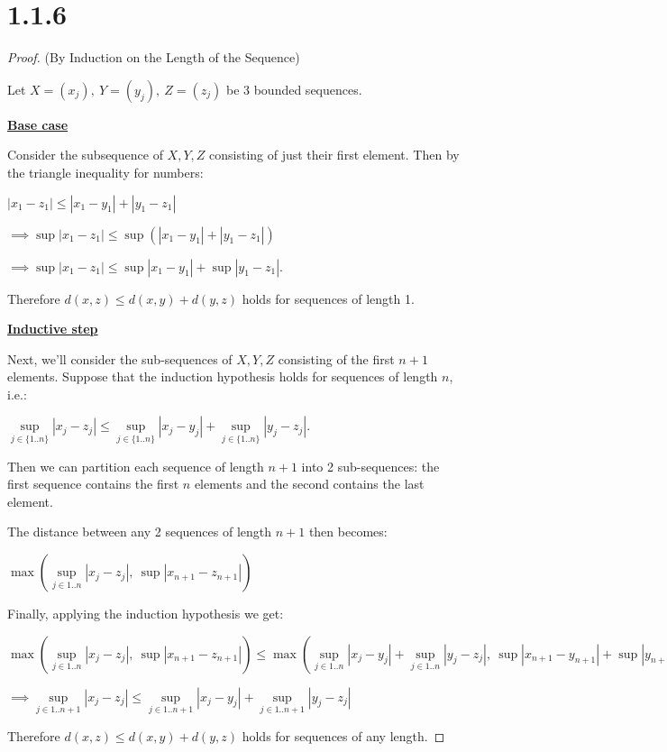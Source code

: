 \documentclass{article}
\begin{document}
\section*{1.1.6}

\begin{proof}{(By Induction on the Length of the Sequence)}
  $ $

  Let $X=(x_j), \ Y=(y_j), \ Z=(z_j)$ be 3 bounded sequences.
  \newline

  \textbf{\underline{Base case}}

  Consider the subsequence of $X,Y,Z$ consisting of just their first element. Then by the triangle inequality for numbers:

  \qquad $|x_1 - z_1| \leq |x_1 - y_1| + |y_1 - z_1|$

  $\implies \sup |x_1 - z_1| \leq \sup (|x_1 - y_1| + |y_1 - z_1|)$

  $\implies \sup |x_1 - z_1| \leq \sup |x_1 - y_1| + \sup |y_1 - z_1|$.
\newline

  Therefore $d(x,z) \leq d(x,y) + d(y,z)$ holds for sequences of length 1.
  \newline

\textbf{\underline{Inductive step}}

Next, we'll consider the sub-sequences of $X,Y,Z$ consisting of the first $n+1$ elements. Suppose that the induction hypothesis holds for sequences of length $n$, i.e.:

\qquad $\sup\limits_{j \in \{1..n\}} |x_j - z_j| \leq \sup\limits_{j \in \{1..n\}} |x_j - y_j| + \sup\limits_{j \in \{1..n\}} |y_j - z_j|$.
\newline

Then we can partition each sequence of length $n+1$ into 2 sub-sequences: the first sequence contains the first $n$ elements and the second contains the last element.
\newline

The distance between any 2 sequences of length $n+1$ then becomes:

\qquad$\max(\sup \limits_{j \in 1..n} |x_j - z_j|, \ \sup |x_{n+1} - z_{n+1}|)$
\newline

Finally, applying the induction hypothesis we get:

\qquad$\max(\sup \limits_{j \in 1..n} |x_j - z_j|, \ \sup |x_{n+1} - z_{n+1}|) \leq \max(\sup\limits_{j \in 1..n} |x_j-y_j| + \sup\limits_{j \in 1..n} |y_j-z_j|, \ \sup |x_{n+1} - y_{n+1}| + \sup |y_{n+1} - z_{n+1}|)$
\newline

$\implies \sup\limits_{j \in 1..n+1} |x_j - z_j| \leq \sup \limits_{j \in 1..n+1} |x_j-y_j| + \sup \limits_{j \in 1..n+1} |y_j-z_j|$
\newline

Therefore $d(x,z) \leq d(x,y) + d(y,z)$ holds for sequences of any length.

\end{proof}
\end{document}
